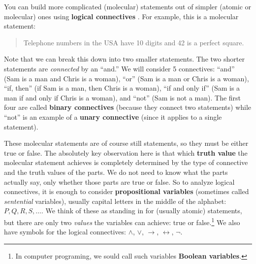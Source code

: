 \documentclass[10pt,]{book}
\newcommand{\terminology}[1]{\textbf{#1}}
\theoremstyle{plain}
\theoremstyle{definition}
\theoremstyle{definition}
\theoremstyle{definition}
\theoremstyle{definition}
\numberwithin{equation}{chapter}
\def\iff{\leftrightarrow}
\def\imp{\rightarrow}
\begin{document}
\par
\hypertarget{p-1367}{}%
You can build more complicated (molecular) statements out of simpler (atomic or molecular) ones using \terminology{logical connectives} . For example, this is a molecular statement:%
\begin{quote}\hypertarget{blockquote-4}{}
\hypertarget{p-1368}{}%
Telephone numbers in the USA have 10 digits and 42 is a perfect square.%
\end{quote}
\hypertarget{p-1369}{}%
Note that we can break this down into two smaller statements. The two shorter statements are \emph{connected} by an ``and.'' We will consider 5 connectives: ``and'' (Sam is a man and Chris is a woman), ``or'' (Sam is a man or Chris is a woman), ``if\textellipsis{}, then\textellipsis{}'' (if Sam is a man, then Chris is a woman), ``if and only if'' (Sam is a man if and only if Chris is a woman), and ``not'' (Sam is not a man). The first four are called \terminology{binary connectives} (because they connect two statements) while ``not'' is an example of a \terminology{unary connective} (since it applies to a single statement).%
\par
\hypertarget{p-1370}{}%
These molecular statements are of course still statements, so they must be either true or false.  The absolutely key observation here is that which \terminology{truth value}  the molecular statement achieves is completely determined by the type of connective and the truth values of the parts. We do not need to know what the parts actually say, only whether those parts are true or false. So to analyze logical connectives, it is enough to consider \terminology{propositional variables} (sometimes called \emph{sentential} variables), usually capital letters in the middle of the alphabet: \(P, Q, R, S, \ldots\).  We think of these as standing in for (usually atomic) statements, but there are only two \emph{values} the variables can achieve: true or false.\footnote{In computer programing, we sould call such variables \terminology{Boolean variables}.\label{fn-9}} \label{notation-9}
 We also have symbols for the logical connectives: \(\wedge\), \(\vee\), \(\imp\), \(\iff\), \(\neg\).%
\end{document}
